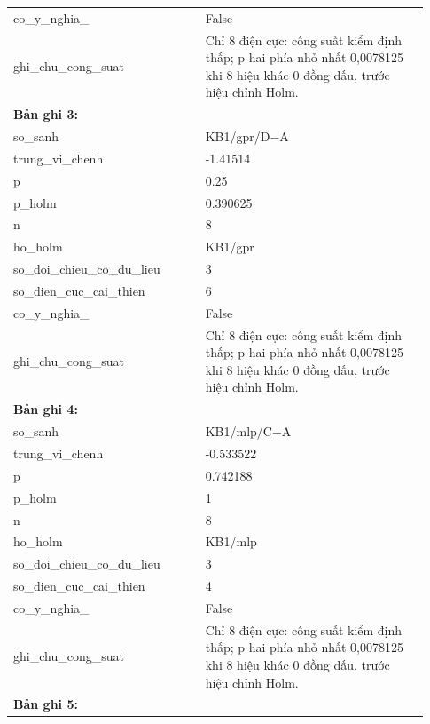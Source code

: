 \begin{longtable}{p{0.43\linewidth}p{0.50\linewidth}}
co\_\allowbreak y\_\allowbreak nghia\_\allowbreak 005 & False \\
ghi\_\allowbreak chu\_\allowbreak cong\_\allowbreak suat & Chỉ 8 điện cực: công suất kiểm định thấp; p hai phía nhỏ nhất 0,0078125 khi 8 hiệu khác 0 đồng dấu, trước hiệu chỉnh Holm. \\
\midrule
\multicolumn{2}{p{0.95\linewidth}}{\textbf{Bản ghi 3: }} \\
so\_\allowbreak sanh & KB1/gpr/D−A \\
trung\_\allowbreak vi\_\allowbreak chenh & -1.41514 \\
p & 0.25 \\
p\_\allowbreak holm & 0.390625 \\
n & 8 \\
ho\_\allowbreak holm & KB1/gpr \\
so\_\allowbreak doi\_\allowbreak chieu\_\allowbreak co\_\allowbreak du\_\allowbreak lieu & 3 \\
so\_\allowbreak dien\_\allowbreak cuc\_\allowbreak cai\_\allowbreak thien & 6 \\
co\_\allowbreak y\_\allowbreak nghia\_\allowbreak 005 & False \\
ghi\_\allowbreak chu\_\allowbreak cong\_\allowbreak suat & Chỉ 8 điện cực: công suất kiểm định thấp; p hai phía nhỏ nhất 0,0078125 khi 8 hiệu khác 0 đồng dấu, trước hiệu chỉnh Holm. \\
\midrule
\multicolumn{2}{p{0.95\linewidth}}{\textbf{Bản ghi 4: }} \\
so\_\allowbreak sanh & KB1/mlp/C−A \\
trung\_\allowbreak vi\_\allowbreak chenh & -0.533522 \\
p & 0.742188 \\
p\_\allowbreak holm & 1 \\
n & 8 \\
ho\_\allowbreak holm & KB1/mlp \\
so\_\allowbreak doi\_\allowbreak chieu\_\allowbreak co\_\allowbreak du\_\allowbreak lieu & 3 \\
so\_\allowbreak dien\_\allowbreak cuc\_\allowbreak cai\_\allowbreak thien & 4 \\
co\_\allowbreak y\_\allowbreak nghia\_\allowbreak 005 & False \\
ghi\_\allowbreak chu\_\allowbreak cong\_\allowbreak suat & Chỉ 8 điện cực: công suất kiểm định thấp; p hai phía nhỏ nhất 0,0078125 khi 8 hiệu khác 0 đồng dấu, trước hiệu chỉnh Holm. \\
\midrule
\multicolumn{2}{p{0.95\linewidth}}{\textbf{Bản ghi 5: }} \\

\end{longtable}
